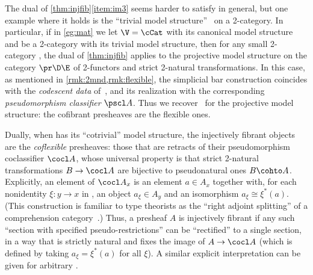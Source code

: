 \begin{concise}
\begin{eg}\label{eg:cat}
  The dual of \cref{thm:injfib}\ref{item:im3} seems harder to satisfy in general, but one example where it holds is the ``trivial model structure''~\cite{lack:htpy-2monads} on a 2-category.
  In particular, if in \cref{eg:mat} we let $\V=\cCat$ with its canonical model structure and \E be a 2-category with its trivial model structure, then for any small 2-category \D, the dual of \cref{thm:injfib} applies to the projective model structure on the category $\pr\D\E$ of 2-functors and strict 2-natural transformations.
  In this case, as mentioned in \cref{rmk:2mnd,rmk:flexible}, the simplicial bar construction coincides with the \emph{codescent data} of~\cite{lack:codescent-coh}, and its realization with the corresponding \emph{pseudomorphism classifier} $\pscl A$.
  Thus we recover~\cite[Theorem 4.12]{lack:htpy-2monads} for the projective model structure: the cofibrant presheaves are the flexible ones.

  Dually, when \E has its ``cotrivial'' model structure, the injectively fibrant objects are the \emph{coflexible} presheaves: those that are retracts of their pseudomorphism coclassifier $\cocl A$, whose universal property is that strict 2-natural transformations $B \to \cocl A$ are bijective to pseudonatural ones $B\cohto A$.
  Explicitly, an element of $\cocl A_x$ is an element $a\in A_x$ together with, for each nonidentity $\xi:y\to x$ in \D, an object $a_\xi\in A_{y}$ and an isomorphism $a_\xi \cong \xi^*(a)$.
  (This construction is familiar to type theorists as the ``right adjoint splitting'' of a comprehension category~\cite{hofmann:ttinlccc,lw:localuniv}.)
  Thus, a presheaf $A$ is injectively fibrant if any such ``section with specified pseudo-restrictions'' can be ``rectified'' to a single section, in a way that is strictly natural and fixes the image of $A\to \cocl A$ (which is defined by taking $a_\xi=\xi^*(a)$ for all $\xi$).
  A similar explicit interpretation can be given for arbitrary \V. %
\end{eg}
\end{concise}

